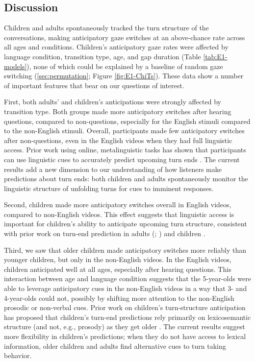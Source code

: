 \documentclass[authoryear, 12pt]{elsarticle}
\begin{document}
\subsection*{Discussion}
\label{sec:discussion1}

Children and adults spontaneously tracked the turn structure of the conversations, making anticipatory gaze switches at an above-chance rate across all ages and conditions. Children's anticipatory gaze rates were affected by language condition, transition type, age, and gap duration (Table \ref{tab:E1-models}), none of which could be explained by a baseline of random gaze switching (\ref{sec:permutation}; Figure \ref{fig:E1-ChiTs}). These data show a number of important features that bear on our questions of interest.

First, both adults' and children's anticipations were strongly affected by transition type. Both groups made more anticipatory switches after hearing questions, compared to non-questions, especially for the English stimuli compared to the non-English stimuli. Overall, participants made few anticipatory switches after non-questions, even in the English videos when they had full linguistic access. Prior work using online, metalinguistic tasks has shown that participants can use linguistic cues to accurately predict upcoming turn ends \citep{torreira2015, magyari2012, de-ruiter2006}. The current results add a new dimension to our understanding of how listeners make predictions about turn ends: both children and adults spontaneously monitor the linguistic structure of unfolding turns for cues to imminent responses.

Second, children made more anticipatory switches overall in English videos, compared to non-English videos. This effect suggests that linguistic access is important for children's ability to anticipate upcoming turn structure, consistent with prior work on turn-end prediction in adults (\citealp{de-ruiter2006}; \citealp{magyari2012}) and children \citep{keitel2013}.

Third, we saw that older children made anticipatory switches more reliably than younger children, but only in the non-English videos. In the English videos, children anticipated well at all ages, especially after hearing questions. This interaction between age and language condition suggests that the 5-year-olds were able to leverage anticipatory cues in the non-English videos in a way that 3- and 4-year-olds could not, possibly by shifting more attention to the non-English prosodic or non-verbal cues. Prior work on children's turn-structure anticipation has proposed that children's turn-end predictions rely primarily on lexicosemantic structure (and not, e.g., prosody) as they get older \citep{keitel2013}. The current results suggest more flexibility in children's predictions; when they do not have access to lexical information, older children and adults find alternative cues to turn taking behavior.
\end{document}
